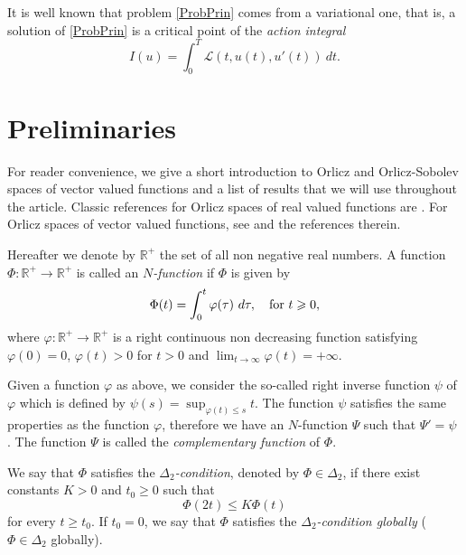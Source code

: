 \documentclass[twoside]{article}
\theoremstyle{remark}
\renewcommand{\leq}{\leqslant}
\renewcommand{\geq}{\geqslant}
\begin{document}
It is well known that problem \eqref{ProbPrin} comes from a variational one, that is,  a solution of \eqref{ProbPrin}  
is a critical point of the \emph{action integral}
\begin{equation}\label{integral_accion}
I(u)=\int_{0}^T \mathcal{L}(t,u(t),u'(t))\ dt.
\end{equation}




\section{Preliminaries}\label{preliminares}

For reader convenience, we give a short introduction to Orlicz and Orlicz-Sobolev spaces of vector valued functions and a  list  of results that we will use throughout the article. 
Classic references for Orlicz spaces of real valued functions are \cite{adams_sobolev,KR,rao1991theory}.
For  Orlicz spaces of vector valued functions, see \cite{Orliczvectorial2005} and the references therein.

Hereafter we denote  by $\mathbb{R}^+$  the set of all non negative real numbers. A function $\Phi:\mathbb{R}^+\to \mathbb{R}^+ $ is called an \emph{$N$-function} if $\Phi$ is given by 
\[
\Phi(t)=\int_{0}^t \varphi(\tau)\ d\tau,\quad\hbox{for } t\geq 0,
\]
where $\varphi:\mathbb{R}^+\rightarrow \mathbb{R}^+$ is a right continuous non decreasing function  satisfying   $\varphi(0)=0$, $\varphi(t)>0$ for $t>0$ and
$\lim_{t\rightarrow \infty}\varphi(t)=+\infty$.

Given a function $\varphi$ as above, we  consider the so-called right inverse function $\psi$ of $\varphi$ which is 
defined by $\psi(s)=\sup_{\varphi(t)\leq s}t$.
The function $\psi$ satisfies the same properties as the function $\varphi$, therefore we have an $N$-function $\Psi$ such that $\Psi'=\psi$ .
 The function $\Psi$ is called the \emph{complementary function} of $\Phi$.


We say that $\Phi$ satisfies the  \emph{$\Delta_2$-condition}, denoted by $\Phi \in \Delta_2$, 
if there exist  constants $K>0$ and  $t_0\geq 0$ such that 
\begin{equation}\label{delta2defi}\Phi(2t)\leq K\Phi(t)
\end{equation}
for every $t\geq t_0$. 
If $t_0=0$,  we say that $\Phi$ satisfies the \emph{$\Delta_2$-condition globally} ($\Phi \in \Delta_2$ globally).  

\end{document}
